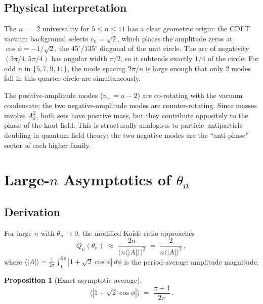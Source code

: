\documentclass[11pt]{article}
\newtheorem{proposition}{Proposition}
\begin{document}
\subsection{Physical interpretation}

The $n_- = 2$ universality for $5 \leq n \leq 11$ has a clear geometric
origin: the CDFT vacuum background selects $c_n = \sqrt{2}$, which places
the amplitude zeros at $\cos\phi = -1/\sqrt{2}$, the $45^\circ/135^\circ$
diagonal of the unit circle.
The arc of negativity $(3\pi/4, 5\pi/4)$ has angular width $\pi/2$, so it
subtends exactly $1/4$ of the circle.
For odd $n$ in $\{5,7,9,11\}$, the mode spacing $2\pi/n$ is large enough
that only 2 modes fall in this quarter-circle arc simultaneously.

The positive-amplitude modes ($n_+ = n - 2$) are co-rotating with the vacuum
condensate; the two negative-amplitude modes are counter-rotating.
Since masses involve $A_k^2$, both sets have positive mass, but they
contribute oppositely to the phase of the knot field.
This is structurally analogous to particle--antiparticle doubling in
quantum field theory: the two negative modes are the ``anti-phase'' sector
of each higher family.


\section{Large-$n$ Asymptotics of $\theta_n$}
\label{sec:asymptotics}

\subsection{Derivation}

For large $n$ with $\theta_n \to 0$, the modified Koide ratio approaches
\begin{equation}
  \widetilde{Q}_n(\theta_n) \;\approx\; \frac{2n}{\bigl(n \langle|A|\rangle\bigr)^2}
    \;=\; \frac{2}{n\langle|A|\rangle^2}\,,
  \label{eq:Qtilde_asymp}
\end{equation}
where $\langle|A|\rangle = \frac{1}{2\pi}\int_0^{2\pi}|1+\sqrt{2}\cos\phi|\,d\phi$
is the period-average amplitude magnitude.

\begin{proposition}[Exact asymptotic average]
  \label{prop:avg}
  \begin{equation}
    \langle|1+\sqrt{2}\cos\phi|\rangle \;=\; \frac{\pi + 4}{2\pi}\,.
    \label{eq:avg_exact}
  \end{equation}
\end{proposition}
\end{document}
